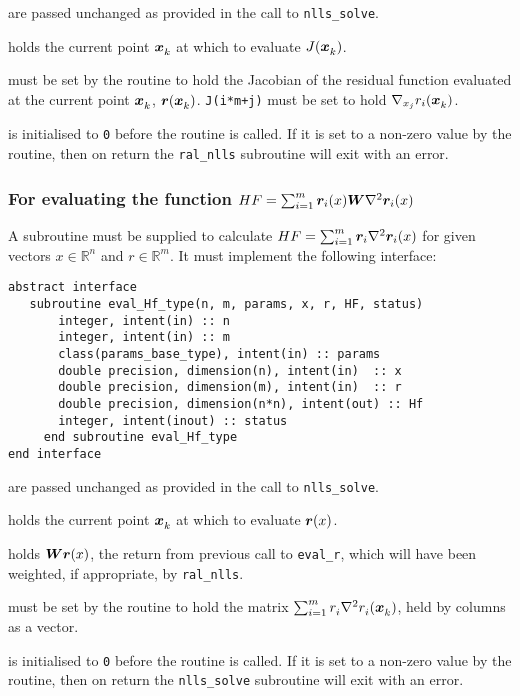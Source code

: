 \documentclass{spec}
\begin{document}
\begin{description}
    are passed unchanged as provided in the call to
      {\tt nlls\_solve}.

    holds the current point ${\bm x}_{k}^{}$ at which to evaluate
      $J({\bm x}_{k}^{})$.

    must be set by the routine to hold the Jacobian of the residual
      function evaluated at the current point ${\bm x}_{k}^{}$, ${\bm r}({\bm x}_{k}^{})$.
      \texttt{J(i*m+j)} must be set to hold $\nabla_{x_j} r_i({\bm x}_{k}^{})$.

    is initialised to \texttt{0} before the routine is
      called. If it is set to a non-zero value by the routine, then on return
      the {\tt ral\_nlls} subroutine will exit with an error.
\end{description}

\subsubsection{For evaluating the function $HF = \sum_{i=1}^m {\bm r}_i(x) {\bm W} \nabla^2 {\bm r}_i(x)$}
A subroutine must be supplied to calculate $HF = \sum_{i=1}^m {\bm r}_i \nabla^2 {\bm r}_i(x)$ for given vectors $x \in \mathbb{R}^n$ and $r \in \mathbb{R}^m$. It must implement the following interface:

\begin{verbatim}
abstract interface
   subroutine eval_Hf_type(n, m, params, x, r, HF, status)
       integer, intent(in) :: n
       integer, intent(in) :: m
       class(params_base_type), intent(in) :: params
       double precision, dimension(n), intent(in)  :: x
       double precision, dimension(m), intent(in)  :: r
       double precision, dimension(n*n), intent(out) :: Hf
       integer, intent(inout) :: status
     end subroutine eval_Hf_type
end interface
\end{verbatim}

\begin{description}
    are passed unchanged as provided in the call to
      {\tt nlls\_solve}.

    holds the current point ${\bm x}_{k}^{}$ at which to evaluate ${\bm r}(x)$.

    holds ${\bm W}{\bm r}(x)$, the return from previous call to \texttt{eval\_r}, which will have been weighted, if appropriate, by {\tt ral\_nlls}.

    must be set by the routine to hold the matrix
      $\sum_{i = 1}^m r_{i}^{}\nabla^2r_{i}^{}({\bm x}_{k}^{})$, held
      by columns as a vector.

    is initialised to \texttt{0} before the routine is called.
      If it is set to a non-zero value by the routine, then on return
      the {\tt nlls\_solve} subroutine will exit with an error.
\end{description}
\end{document}
